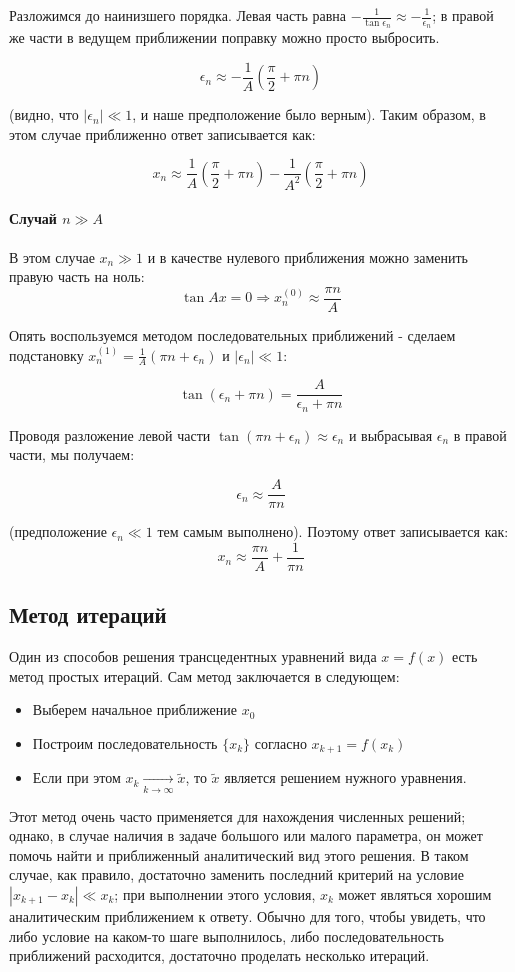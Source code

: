 \documentclass[a4paper,12pt]{article}
\begin{document}
\noindent
Разложимся до наинизшего порядка. Левая часть равна $-\frac{1}{\tan\epsilon_{n}}\approx-\frac{1}{\epsilon_{n}}$;
в правой же части в ведущем приближении поправку можно просто выбросить.

\[
\epsilon_{n}\approx-\frac{1}{A}\left(\frac{\pi}{2}+\pi n\right)
\]

\noindent
(видно, что $|\epsilon_{n}|\ll1$, и наше предположение было верным).
Таким образом, в этом случае приближенно ответ записывается как:

\[
x_{n}\approx\frac{1}{A}\left(\frac{\pi}{2}+\pi n\right)-\frac{1}{A^{2}}\left(\frac{\pi}{2}+\pi n\right)
\]



\paragraph{Случай $n\gg A$}

В этом случае $x_{n}\gg1$ и в качестве нулевого приближения можно
заменить правую часть на ноль: 
\[
\tan Ax=0\Rightarrow x_{n}^{(0)}\approx\frac{\pi n}{A}
\]

\noindent
Опять воспользуемся методом последовательных приближений - сделаем
подстановку $x_{n}^{(1)}=\frac{1}{A}(\pi n+\epsilon_{n})$ и $|\epsilon_{n}|\ll1$:

\[
\tan\left(\epsilon_{n}+\pi n\right)=\frac{A}{\epsilon_{n}+\pi n}
\]

\noindent
Проводя разложение левой части $\tan(\pi n+\epsilon_{n})\approx\epsilon_{n}$
и выбрасывая $\epsilon_{n}$ в правой части, мы получаем:

\[
\epsilon_{n}\approx\frac{A}{\pi n}
\]

\noindent
(предположение $\epsilon_{n}\ll1$ тем самым выполнено). Поэтому ответ
записывается как:
\[
x_{n}\approx\frac{\pi n}{A}+\frac{1}{\pi n}
\]

\subsection*{Метод итераций}

Один из способов решения трансцедентных уравнений вида $x=f(x)$ есть
метод простых итераций. Сам метод заключается в следующем:
\begin{itemize}
	\item Выберем начальное приближение $x_{0}$
	\item Построим последовательность $\{x_{k}\}$ согласно $x_{k+1}=f(x_{k})$
	\item Если при этом $x_{k}\underset{k\to\infty}{\to}\widetilde{x}$, то
	$\widetilde{x}$ является решением нужного уравнения.
\end{itemize}
Этот метод очень часто применяется для нахождения численных решений;
однако, в случае наличия в задаче большого или малого параметра, он
может помочь найти и приближенный аналитический вид этого решения.
В таком случае, как правило, достаточно заменить последний критерий
на условие $\left|x_{k+1}-x_{k}\right|\ll x_{k}$; при выполнении
этого условия, $x_{k}$ может являться хорошим аналитическим приближением
к ответу. Обычно для того, чтобы увидеть, что либо условие на каком-то шаге выполнилось, либо последовательность приближений расходится, достаточно проделать несколько итераций.
\end{document}
